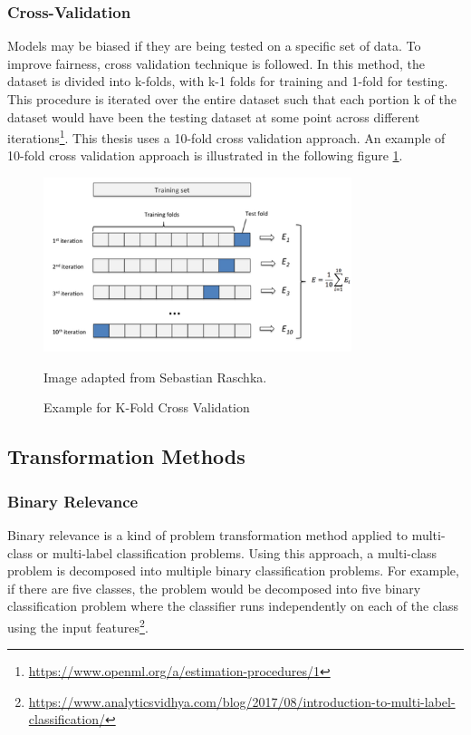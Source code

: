 \documentclass[a4paper,12pt,twoside]{report}
\begin{document}
\subsubsection{Cross-Validation} 
Models may be biased if they are being tested on a specific set of data. To improve fairness, cross validation technique is followed. In this method, the dataset is divided into k-folds, with k-1 folds for training and 1-fold for testing. This procedure is iterated over the entire dataset such that each portion k of the dataset would have been the testing dataset at some point across different iterations\footnote{\url{https://www.openml.org/a/estimation-procedures/1}}. This thesis uses a 10-fold cross validation approach. An example of 10-fold cross validation approach is illustrated in the following figure \ref{fig:k-fold}.
\begin{figure}[h] %
    \centering
    \includegraphics[width=9cm]{k-fold}
    \caption{Example for K-Fold Cross Validation}
    \small Image adapted from Sebastian Raschka\footnotemark.
    \label{fig:k-fold}
\end{figure}

\subsection{Transformation Methods}

\subsubsection{Binary Relevance} 
Binary relevance is a kind of problem transformation method applied to multi-class or multi-label classification problems. Using this approach, a multi-class problem is decomposed into multiple binary classification problems. For example, if there are five classes, the problem would be decomposed into five binary classification problem where the classifier runs independently on each of the class using the input features\footnote{\url{https://www.analyticsvidhya.com/blog/2017/08/introduction-to-multi-label-classification/}}. 
\end{document}
